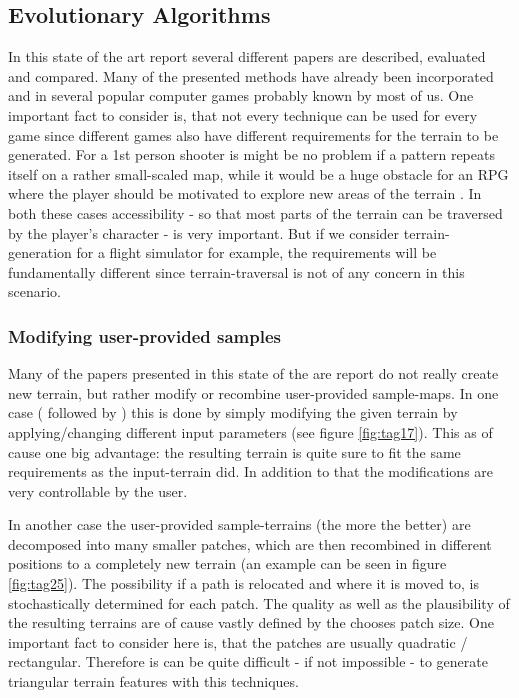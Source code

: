 \subsection{Evolutionary Algorithms}
In this state of the art report several different papers are described, evaluated and compared. Many of the presented methods have already been incorporated and in several popular computer games probably known by most of us. One important fact to consider is, that not every technique can be used for every game since different games also have different requirements for the terrain to be generated. For a 1st person shooter is might be no problem if a pattern repeats itself on a rather small-scaled map, while it would be a huge obstacle for an RPG where the player should be motivated to explore new areas of the terrain \cite{raffe2012survey}. In both these cases accessibility - so that most parts of the terrain can be traversed by the player's character - is very important. But if we consider terrain-generation for a flight simulator for example, the requirements will be fundamentally different since terrain-traversal is not of any concern in this scenario.

\subsubsection{Modifying user-provided samples}
Many of the papers presented in this state of the are report do not really create new terrain, but rather modify or recombine user-provided sample-maps. In one case (\cite{walsh2010terrain} followed by \cite{walsh2011use}) this is done by simply modifying the given terrain by applying/changing different input parameters (see figure \ref{fig:tag17}). This as of cause one big advantage: the resulting terrain is quite sure to fit the same requirements as the input-terrain did. In addition to that the modifications are very controllable by the user.

In another case \cite{raffe2011evolving} the user-provided sample-terrains (the more the better) are decomposed into many smaller patches, which are then recombined in different positions to a completely new terrain (an example can be seen in figure \ref{fig:tag25}). The possibility if a path is relocated and where it is moved to, is stochastically determined for each patch. The quality as well as the plausibility of the resulting terrains are of cause vastly defined by the chooses patch size. One important fact to consider here is, that the patches are usually quadratic / rectangular. Therefore is can be quite difficult - if not impossible - to generate triangular terrain features with this techniques.

